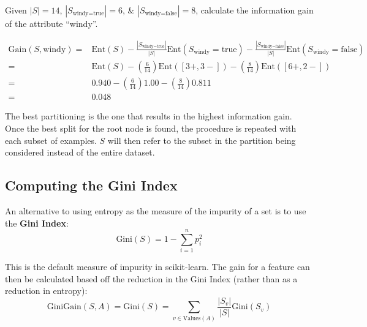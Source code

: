 \documentclass[a4paper,11pt]{article}
\begin{document}
\begin{tcolorbox}[colback=gray!10, colframe=black, title=\textbf{Worked Information Gain Example}]
    Given $\left| S \right| = 14$, $\left| S_{\text{windy} = \text{true}} \right| = 6$, \& $\left| S_{\text{windy} = \text{false}} \right| = 8$, calculate the information gain of the attribute ``windy''.

    \begin{align*}
        \text{Gain}(S, \text{windy}) =& \text{Ent}(S) - \frac{\left| S_{\text{windy} = \text{true}} \right|}{\left| S \right|} \text{Ent}(S_\text{windy} = \text{true})
        -  \frac{\left| S_{\text{windy} = \text{false}} \right|}{\left| S \right|} \text{Ent}(S_\text{windy} = \text{false}) \\
        =& \text{Ent}(S) - \left( \frac{6}{14} \right) \text{Ent}(\left[3+,3-\right]) - \left( \frac{8}{14} \right) \text{Ent}(\left[ 6+,2- \right]) \\
        =& 0.940 - \left( \frac{6}{14} \right) 1.00 - \left( \frac{8}{14} \right) 0.811\\
        =& 0.048
    \end{align*}
\end{tcolorbox}

The best partitioning is the one that results in the highest information gain.
Once the best split for the root node is found, the procedure is repeated with each subset of examples.
$S$ will then refer to the subset in the partition being considered instead of the entire dataset.

\subsection{Computing the Gini Index}
An alternative to using entropy as the measure of the impurity of a set is to use the \textbf{Gini Index}:
\[
    \text{Gini}(S) = 1 - \sum^n_{i=1} p_i^2
\]

This is the default measure of impurity in scikit-learn.
The gain for a feature can then be calculated based off the reduction in the Gini Index (rather than as a reduction in entropy):
\[
    \text{GiniGain}(S,A) = \text{Gini}(S) = \sum_{v \in \text{Values}(A)} \frac{\left| S_v \right|}{\left|S\right|}\text{Gini}(S_v)
\]
\end{document}
